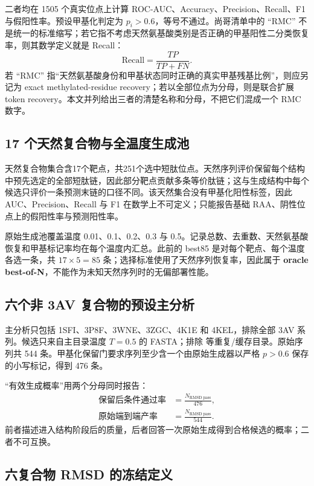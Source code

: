 二者均在 1505 个真实位点上计算 ROC-AUC、Accuracy、Precision、Recall、F1 与假阳性率。预设甲基化判定为 $p_i>0.6$，等号不通过。尚哥清单中的 ``RMC'' 不是统一的标准缩写；若它指不考虑天然氨基酸类别是否正确的甲基阳性二分类恢复率，则其数学定义就是 Recall：
\begin{equation}
\mathrm{Recall}=\frac{TP}{TP+FN}.
\end{equation}
若 ``RMC'' 指“天然氨基酸身份和甲基状态同时正确的真实甲基残基比例”，则应另记为 exact methylated-residue recovery；若以全部位点为分母，则是联合扩展 token recovery。本文并列给出三者的清楚名称和分母，不把它们混成一个 RMC 数字。

\subsection{17 个天然复合物与全温度生成池}

天然复合物集合含17个靶点，共251个选中短肽位点。天然序列评价保留每个结构中预先选定的全部短肽链，因此部分靶点贡献多条等价肽链；这与生成结构中每个候选只评价一条预测末链的口径不同。该天然集合没有甲基化阳性标签，因此 AUC、Precision、Recall 与 F1 在数学上不可定义；只能报告基础 RAA、阴性位点上的假阳性率与预测阳性率。

原始生成池覆盖温度 0.01、0.1、0.2、0.3 与 0.5。记录总数、去重数、天然氨基酸恢复和甲基标记率均在每个温度内汇总。此前的 best85 是对每个靶点、每个温度各选一条，共 $17\times5=85$ 条；选择标准使用了天然序列恢复率，因此属于 \textbf{oracle best-of-N}，不能作为未知天然序列时的无偏部署性能。

\subsection{六个非 3AV 复合物的预设主分析}

主分析只包括 1SFI、3P8F、3WNE、3ZGC、4K1E 和 4KEL，排除全部 3AV 系列。候选只来自主目录温度 $T=0.5$ 的 FASTA；排除  等重复/缓存目录。原始序列共 544 条。甲基化保留门要求序列至少含一个由原始生成器以严格 $p>0.6$ 保存的小写标记，得到 476 条。

“有效生成概率”用两个分母同时报告：
\begin{align}
\text{保留后条件通过率} &= \frac{N_{\mathrm{RMSD\ pass}}}{476},\\
\text{原始端到端产率} &= \frac{N_{\mathrm{RMSD\ pass}}}{544}.
\end{align}
前者描述进入结构阶段后的质量，后者回答一次原始生成得到合格候选的概率；二者不可互换。

\subsection{六复合物 RMSD 的冻结定义}

